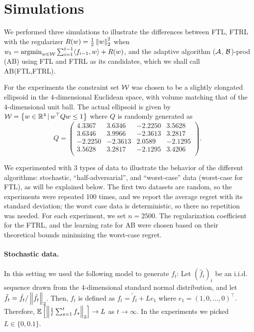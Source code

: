 \section{Simulations}
\label{sec:Simulations}
We performed three simulations to illustrate the differences between  FTL, FTRL with the regularizer $R(w) = \frac12 \left\| w \right\|_2^2$ when
$w_t = \operatorname*{argmin}_{w\in \mathcal{W}} \sum_{i=1}^{t-1} \langle f_{i-1},w\rangle + R(w)$,
and the adaptive algorithm ($\mathcal{A}$, $\mathcal{B}$)-prod (AB) using FTL and FTRL as its candidates, which we shall call AB(FTL,FTRL).

For the experiments the constraint set $\mathcal{W}$ was chosen to be a slightly elongated ellipsoid in the $4$-dimensional Euclidean space, with volume matching that of the $4$-dimensional unit ball.
The actual ellipsoid is given by 
$\mathcal{W} = \left\{w\in \mathbb{R}^4 \,\vert\, w^{\top}Qw \le 1 \right\}$
where $Q$ is randomly generated as
\[
Q  = \left(\begin{array}{cccc}
4.3367    & 3.6346   & -2.2250   & 3.5628 \\
3.6346    & 3.9966   & -2.3613   & 3.2817\\
-2.2250   & -2.3613  &  2.0589  & -2.1295\\
3.5628    & 3.2817  & -2.1295  &  3.4206\\
\end{array}\right).
\]

We experimented with 3 types of data to illustrate the behavior of the different algorithms: stochastic, ``half-adversarial'', and ``worst-case'' data (worst-case for FTL), as will be explained below.
The first two datasets are random, so the experiments were repeated 100 times, and we report the average regret with its standard deviation; the worst case data is deterministic, so there no repetition was needed.
For each experiment, we set $n = 2500$. 
The regularization coefficient for the FTRL, and the learning rate for AB were chosen based on their theoretical bounds
minimizing the worst-case regret.


\paragraph{Stochastic data.}
In this setting  we used the following model to generate $f_t$:
Let  $(\hat{f}_t)_t$ be an i.i.d. sequence drawn from the 4-dimensional standard normal distribution, and let $\tilde{f}_t = \hat{f}_t/\left\| \hat{f}_t \right\|_2$.
Then, $f_t$ is defined as $f_t = \tilde{f}_t  + L e_1$ where $e_1 = (1,0,\dots,0)^\top$. 
Therefore, $\mathbb{E}\left[ \left\| \tfrac{1}{t}\sum_{s=1}^t f_s \right\|_2 \right] \to L$ as $t \to \infty$.
In the experiments we picked $L \in \{0, 0.1\}$.


